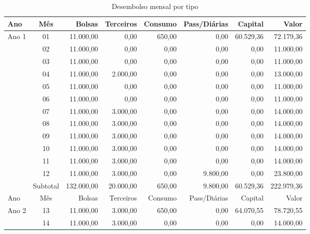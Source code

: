 \begin{table}[!h]
\scriptsize
	\caption{Desembolso mensal por tipo}
\centering
\begin{tabular}{lcrrrrrr}
\toprule
   \rowcolor{lgray}
	Ano  & Mês      & Bolsas  & Terceiros  & Consumo & Pass/Diárias & Capital    & Valor \\
\midrule
       Ano 1 & 01       &  11.000,00 &      0,00 & 650,00  &     0,00     & 60.529,36 &  72.179,36\\
             & 02       &  11.000,00 &      0,00 &   0,00  &     0,00     &      0,00 &   11.000,00\\
             & 03       &  11.000,00 &      0,00 &   0,00  &     0,00     &      0,00 &   11.000,00\\
             & 04       &  11.000,00 &  2.000,00 &   0,00  &     0,00     &      0,00 &   13.000,00\\
             & 05       &  11.000,00 &      0,00 &   0,00  &     0,00     &      0,00 &   11.000,00\\
             & 06       &  11.000,00 &      0,00 &   0,00  &     0,00     &      0,00 &   11.000,00\\
             & 07       &  11.000,00 &  3.000,00 &   0,00  &     0,00     &      0,00 &   14.000,00\\
             & 08       &  11.000,00 &  3.000,00 &   0,00  &     0,00     &      0,00 &   14.000,00\\
             & 09       &  11.000,00 &  3.000,00 &   0,00  &     0,00     &      0,00 &   14.000,00\\
             & 10       &  11.000,00 &  3.000,00 &   0,00  &     0,00     &      0,00 &   14.000,00\\
             & 11       &  11.000,00 &  3.000,00 &   0,00  &     0,00     &      0,00 &   14.000,00\\
             & 12       &  11.000,00 &  3.000,00 &   0,00  & 9.800,00     &      0,00 &   23.800,00\\
\midrule
	     & Subtotal & 132.000,00 & 20.000,00 & 650,00  & 9.800,00     & 60.529,36 & 222.979,36\\
\midrule
\midrule
   \rowcolor{lgray}
	Ano  & Mês      & Bolsas  & Terceiros  & Consumo & Pass/Diárias & Capital    & Valor \\
\midrule
       Ano 2 & 13       &  11.000,00 &  3.000,00 & 650,00  &      0,00   & 64.070,55 &  78.720,55\\
             & 14       &  11.000,00 &  3.000,00 &   0,00  &      0,00   &      0,00 &  14.000,00\\

\end{tabular}
\end{table}
